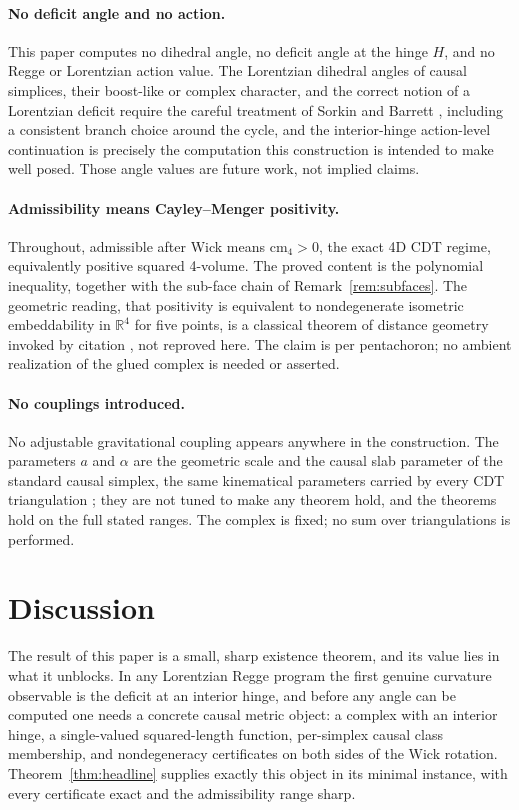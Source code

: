 \documentclass[11pt]{article}
\theoremstyle{definition}
\theoremstyle{remark}
\newcommand{\cm}{\mathrm{cm}_{4}}
\newcommand{\R}{\mathbb{R}}
\begin{document}
\paragraph{No deficit angle and no action.}
This paper computes no dihedral angle, no deficit angle at the hinge $H$, and no Regge or Lorentzian action value. The Lorentzian dihedral angles of causal simplices, their boost-like or complex character, and the correct notion of a Lorentzian deficit require the careful treatment of Sorkin and Barrett \cite{Sorkin1975,SorkinAngles,Barrett,BarrettFoxon}, including a consistent branch choice around the cycle, and the interior-hinge action-level continuation is precisely the computation this construction is intended to make well posed. Those angle values are future work, not implied claims.

\paragraph{Admissibility means Cayley--Menger positivity.}
Throughout, admissible after Wick means $\cm>0$, the exact 4D CDT regime, equivalently positive squared 4-volume. The proved content is the polynomial inequality, together with the sub-face chain of Remark~\ref{rem:subfaces}. The geometric reading, that positivity is equivalent to nondegenerate isometric embeddability in $\R^{4}$ for five points, is a classical theorem of distance geometry invoked by citation \cite{Menger,Blumenthal,Berger}, not reproved here. The claim is per pentachoron; no ambient realization of the glued complex is needed or asserted.

\paragraph{No couplings introduced.}
No adjustable gravitational coupling appears anywhere in the construction. The parameters $a$ and $\alpha$ are the geometric scale and the causal slab parameter of the standard causal simplex, the same kinematical parameters carried by every CDT triangulation \cite{AJL,Loll}; they are not tuned to make any theorem hold, and the theorems hold on the full stated ranges. The complex is fixed; no sum over triangulations is performed.

\section{Discussion}
\label{sec:discussion}

The result of this paper is a small, sharp existence theorem, and its value lies in what it unblocks. In any Lorentzian Regge program the first genuine curvature observable is the deficit at an interior hinge, and before any angle can be computed one needs a concrete causal metric object: a complex with an interior hinge, a single-valued squared-length function, per-simplex causal class membership, and nondegeneracy certificates on both sides of the Wick rotation. Theorem~\ref{thm:headline} supplies exactly this object in its minimal instance, with every certificate exact and the admissibility range sharp.
\end{document}
